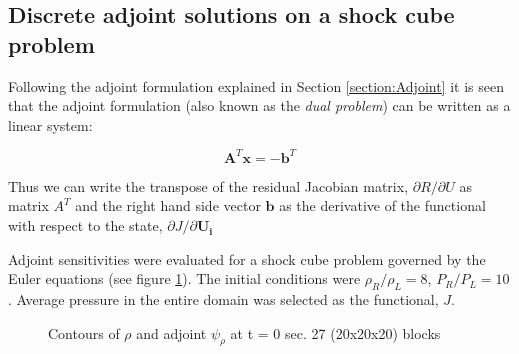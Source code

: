 \subsection{Discrete adjoint solutions on a shock cube problem}
\label{subsection:Discrete_Adjoint}

Following the adjoint formulation explained in Section \ref{section:Adjoint} it is seen that the adjoint formulation (also known as the \textit{dual problem}) can be written as a linear system:

\begin{equation}
\mathbf{A}^T\mathbf{x} = -\mathbf{b}^T
\end{equation}

Thus we can write the transpose of the residual Jacobian matrix, ${\partial{R}}/{\partial{U}}$ as matrix $A^T$ and the right hand side vector $\mathbf{b}$ as the derivative of the functional with respect to the state, ${\partial{J}}/{\partial{\mathbf{U_i}}}$\par

Adjoint sensitivities were evaluated for a shock cube problem governed by the Euler equations (see figure \ref{fig:Adjoints}). The initial conditions were ${\rho_R}/{\rho_L} = 8$, ${P_R}/{P_L} = 10$. Average pressure in the entire domain was selected as the functional, $J$. \par

\begin{figure}[t!]
  \centering
\caption{Contours of $\rho$ and adjoint $\psi_{\rho}$ at t = 0 sec. 27 (20x20x20) blocks} 
\label{fig:Adjoints}      
\end{figure}  